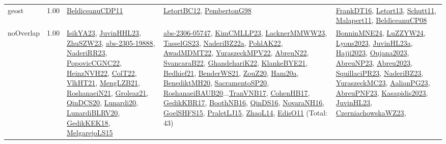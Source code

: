 {\begin{longtable}{p{3cm}r>{\raggedright\arraybackslash}p{6cm}>{\raggedright\arraybackslash}p{6cm}>{\raggedright\arraybackslash}p{8cm}}
\index{geost}\index{Constraints!geost}geost &  1.00 & \hyperref[detail:BeldiceanuCDP11]{BeldiceanuCDP11} & \hyperref[detail:LetortBC12]{LetortBC12}, \hyperref[detail:PembertonG98]{PembertonG98} & \hyperref[detail:FrankDT16]{FrankDT16}, \hyperref[detail:Letort13]{Letort13}, \hyperref[detail:Schutt11]{Schutt11}, \hyperref[detail:Malapert11]{Malapert11}, \hyperref[detail:BeldiceanuCP08]{BeldiceanuCP08}\\
\index{noOverlap}\index{Constraints!noOverlap}noOverlap &  1.00 & \hyperref[detail:IsikYA23]{IsikYA23}, \hyperref[detail:JuvinHHL23]{JuvinHHL23}, \hyperref[detail:ZhuSZW23]{ZhuSZW23}, \hyperref[detail:abs-2305-19888]{abs-2305-19888}, \hyperref[detail:NaderiRR23]{NaderiRR23}, \hyperref[detail:PopovicCGNC22]{PopovicCGNC22}, \hyperref[detail:HeinzNVH22]{HeinzNVH22}, \hyperref[detail:ColT22]{ColT22}, \hyperref[detail:VlkHT21]{VlkHT21}, \hyperref[detail:MengLZB21]{MengLZB21}, \hyperref[detail:RoshanaeiN21]{RoshanaeiN21}, \hyperref[detail:Groleaz21]{Groleaz21}, \hyperref[detail:QinDCS20]{QinDCS20}, \hyperref[detail:Lunardi20]{Lunardi20}, \hyperref[detail:LunardiBLRV20]{LunardiBLRV20}, \hyperref[detail:GedikKEK18]{GedikKEK18}, \hyperref[detail:MelgarejoLS15]{MelgarejoLS15} & \hyperref[detail:abs-2306-05747]{abs-2306-05747}, \hyperref[detail:KimCMLLP23]{KimCMLLP23}, \hyperref[detail:LacknerMMWW23]{LacknerMMWW23}, \hyperref[detail:TasselGS23]{TasselGS23}, \hyperref[detail:NaderiBZ22a]{NaderiBZ22a}, \hyperref[detail:PohlAK22]{PohlAK22}, \hyperref[detail:AwadMDMT22]{AwadMDMT22}, \hyperref[detail:YuraszeckMPV22]{YuraszeckMPV22}, \hyperref[detail:AbreuN22]{AbreuN22}, \hyperref[detail:SvancaraB22]{SvancaraB22}, \hyperref[detail:GhandehariK22]{GhandehariK22}, \hyperref[detail:KlankeBYE21]{KlankeBYE21}, \hyperref[detail:Bedhief21]{Bedhief21}, \hyperref[detail:BenderWS21]{BenderWS21}, \hyperref[detail:ZouZ20]{ZouZ20}, \hyperref[detail:Ham20a]{Ham20a}, \hyperref[detail:BenediktMH20]{BenediktMH20}, \hyperref[detail:SacramentoSP20]{SacramentoSP20}, \hyperref[detail:RoshanaeiBAUB20]{RoshanaeiBAUB20}...\hyperref[detail:TranVNB17]{TranVNB17}, \hyperref[detail:CohenHB17]{CohenHB17}, \hyperref[detail:GedikKBR17]{GedikKBR17}, \hyperref[detail:BoothNB16]{BoothNB16}, \hyperref[detail:QinDS16]{QinDS16}, \hyperref[detail:NovaraNH16]{NovaraNH16}, \hyperref[detail:GoelSHFS15]{GoelSHFS15}, \hyperref[detail:PraletLJ15]{PraletLJ15}, \hyperref[detail:ZhaoL14]{ZhaoL14}, \hyperref[detail:EdisO11]{EdisO11} (Total: 43) & \hyperref[detail:BonninMNE24]{BonninMNE24}, \hyperref[detail:LuZZYW24]{LuZZYW24}, \hyperref[detail:Lyons2023]{Lyons2023}, \hyperref[detail:JuvinHL23a]{JuvinHL23a}, \hyperref[detail:Hajji2023]{Hajji2023}, \hyperref[detail:Oujana2023]{Oujana2023}, \hyperref[detail:AbreuNP23]{AbreuNP23}, \hyperref[detail:Abreu2023]{Abreu2023}, \hyperref[detail:SquillaciPR23]{SquillaciPR23}, \hyperref[detail:NaderiBZ23]{NaderiBZ23}, \hyperref[detail:YuraszeckMC23]{YuraszeckMC23}, \hyperref[detail:AalianPG23]{AalianPG23}, \hyperref[detail:AbreuPNF23]{AbreuPNF23}, \hyperref[detail:Kasapidis2023]{Kasapidis2023}, \hyperref[detail:JuvinHL23]{JuvinHL23}, \hyperref[detail:CzerniachowskaWZ23]{CzerniachowskaWZ23}, 
\end{longtable}}
